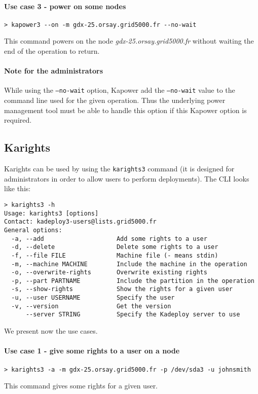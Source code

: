 \documentclass[a4wide,10pt,oneside]{book}
\begin{document}
\paragraph{Use case 3 - power on some nodes}
\begin{verbatim}
> kapower3 --on -m gdx-25.orsay.grid5000.fr --no-wait
\end{verbatim}
This command powers on the node \textit{gdx-25.orsay.grid5000.fr} without waiting the end of the operation to return.

\paragraph{Note for the administrators}
While using the \texttt{--no-wait} option, Kapower add the \texttt{--no-wait} value to the command line used for the given operation. Thus the underlying power management tool must be able to handle this option if this Kapower option is required.


\subsection{Karights}\label{sec:karights}
Karights can be used by using the \texttt{karights3} command (it is designed for administrators in order to allow users to perform deployments). The CLI looks like this:
\begin{small}
\begin{verbatim}
> karights3 -h
Usage: karights3 [options]
Contact: kadeploy3-users@lists.grid5000.fr
General options:
  -a, --add                    Add some rights to a user
  -d, --delete                 Delete some rights to a user
  -f, --file FILE              Machine file (- means stdin)
  -m, --machine MACHINE        Include the machine in the operation
  -o, --overwrite-rights       Overwrite existing rights
  -p, --part PARTNAME          Include the partition in the operation
  -s, --show-rights            Show the rights for a given user
  -u, --user USERNAME          Specify the user
  -v, --version                Get the version
      --server STRING          Specify the Kadeploy server to use
\end{verbatim}
\end{small}

We present now the use cases.
\paragraph{Use case 1 - give some rights to a user on a node}
\begin{verbatim}
> karights3 -a -m gdx-25.orsay.grid5000.fr -p /dev/sda3 -u johnsmith
\end{verbatim}
This command gives some rights for a given user.
\end{document}
